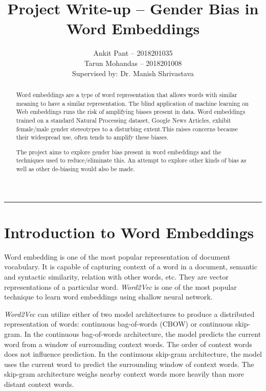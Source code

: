 \documentclass[12pt, a4paper]{article}
\title{\Large{Project Write-up -- Gender Bias in Word Embeddings}}
\author{Ankit Pant -- 2018201035 \\ Tarun Mohandas -- 2018201008 \\
	Supervised by: Dr. Manish Shrivastava}
\date{}
\begin{document}
	\maketitle
	\thispagestyle{empty}
	\noindent\rule{\textwidth}{1pt}
	\newpage
	\setcounter{page}{1}
	\begin{abstract}
		Word embeddings are a type of word representation that allows words with similar meaning to have a similar representation. The blind application of machine learning on Web embeddings runs the risk of amplifying biases present in data. Word embeddings trained on a standard Natural Processing dataset, Google News Articles, exhibit female/male gender stereotypes to a disturbing extent.This raises concerns because their widespread use, often tends to amplify these biases.
		\par The project aims to explore gender bias present in word embeddings and the techniques used to reduce/eliminate this. An attempt to explore other kinds of bias as well as other de-biasing would also be made.
	\end{abstract}
	\newpage
	
	\tableofcontents
	\newpage
	
	\setcounter{page}{1}
	\section{Introduction to Word Embeddings}
		Word embedding is one of the most popular representation of document vocabulary. It is capable of capturing context of a word in a document, semantic and syntactic similarity, relation with other words, etc. They are vector representations of a particular word. \emph{Word2Vec} is one of the most popular technique to learn word embeddings using shallow neural network. 
		\par
		\emph{Word2Vec} can utilize either of two model architectures to produce a distributed representation of words: continuous bag-of-words (CBOW) or continuous skip-gram. In the continuous bag-of-words architecture, the model predicts the current word from a window of surrounding context words. The order of context words does not influence prediction. In the continuous skip-gram architecture, the model uses the current word to predict the surrounding window of context words. The skip-gram architecture weighs nearby context words more heavily than more distant context words.
	
\end{document}
